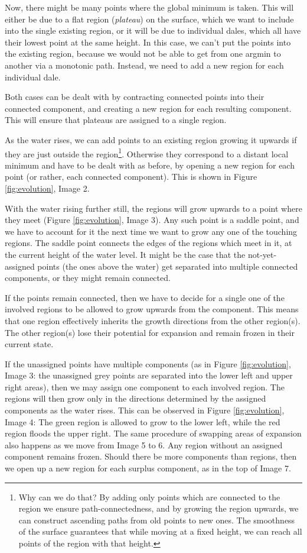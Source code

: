 \documentclass[11pt,twoside,twocolumn,a4paper]{article}
\theoremstyle{plain}
\theoremstyle{definition}
\begin{document}
Now, there might be many points where the global minimum is taken.
This will either be due to a flat region (\emph{plateau}) on the surface, which we want to include into the single existing region, or it will be due to individual dales, which all have their lowest point at the same height.
In this case, we can't put the points into the existing region, because we would not be able to get from one argmin to another via a monotonic path.
Instead, we need to add a new region for each individual dale.

Both cases can be dealt with by contracting connected points into their connected component, and creating a new region for each resulting component. This will ensure that plateaus are assigned to a single region.

As the water rises, we can add points to an existing region growing it upwards if they are just outside the region\footnote{Why can we do that?
By adding only points which are connected to the region we ensure path-connectedness, and by growing the region upwards, we can construct ascending paths from old points to new ones.
The smoothness of the surface guarantees that while moving at a fixed height, we can reach all points of the region with that height.}.
Otherwise they correspond to a distant local minimum and have to be dealt with as before, by opening a new region for each point (or rather, each connected component).
This is shown in Figure \ref{fig:evolution}, Image 2.

With the water rising further still, the regions will grow upwards to a point where they meet (Figure \ref{fig:evolution}, Image 3).
Any such point is a saddle point, and we have to account for it the next time we want to grow any one of the touching regions.
The saddle point connects the edges of the regions which meet in it, at the current height of the water level.
It might be the case that the not-yet-assigned points (the ones above the water) get separated into multiple connected components, or they might remain connected.

If the points remain connected, then we have to decide for a single one of the involved regions to be allowed to grow upwards from the component.
This means that one region effectively inherits the growth directions from the other region(s).
The other region(s) lose their potential for expansion and remain frozen in their current state.

If the unassigned points have multiple components (as in Figure \ref{fig:evolution}, Image 3: the unassigned grey points are separated into the lower left and upper right areas), then we may assign one component to each involved region.
The regions will then grow only in the directions determined by the assigned components as the water rises.
This can be observed in Figure \ref{fig:evolution}, Image 4: The green region is allowed to grow to the lower left, while the red region floods the upper right.
The same procedure of swapping areas of expansion also happens as we move from Image 5 to 6.
Any region without an assigned component remains frozen.
Should there be more components than regions, then we open up a new region for each surplus component, as in the top of Image 7.
\end{document}
